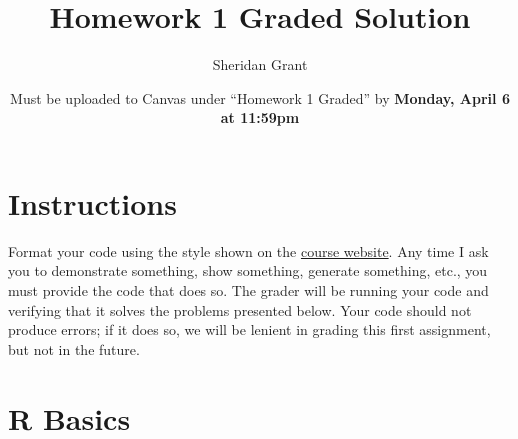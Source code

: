 \documentclass[12pt]{article}
\title{Homework 1 Graded Solution}
\author{Sheridan Grant}
\date{Must be uploaded to Canvas under ``Homework 1 Graded'' by \textbf{Monday, April 6 at 11:59pm}}
\begin{document}
\sloppy

\maketitle

\section*{Instructions}

Format your code using the style shown on the \href{https://sheridanlgrant.github.io/teaching/STAT302_SPR2020}{course website}. Any time I ask you to demonstrate something, show something, generate something, etc., you must provide the code that does so. The grader will be running your code and verifying that it solves the problems presented below. Your code should not produce errors; if it does so, we will be lenient in grading this first assignment, but not in the future.

\section{R Basics}
\end{document}
